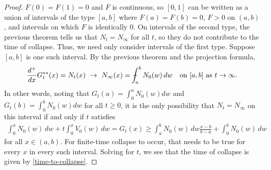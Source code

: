 \documentclass[11pt]{article}
\numberwithin{equation}{section}
\def\Xint#1{\mathchoice
{\XXint\displaystyle\textstyle{#1}}%
{\XXint\textstyle\scriptstyle{#1}}%
{\XXint\scriptstyle\scriptscriptstyle{#1}}%
{\XXint\scriptscriptstyle\scriptscriptstyle{#1}}%
   \!\int}
\def\XXint#1#2#3{{\setbox0=\hbox{$#1{#2#3}{\int}$}
\vcenter{\hbox{$#2#3$}}\kern-.5\wd0}}
\def\dashint{\Xint-}
\begin{document}
\begin{proof}
    $F(0)=F(1)=0$ and $F$ is continuous, so $[0,1]$ can be written as a union of intervals of the type $[a,b]$ where $F(a)=F(b)=0$, $F>0$ on $(a,b)$, and intervals on which $F$ is identically $0$. On intervals of the second type, the previous theorem tells us that $N_t=N_\infty$ for all $t$, so they do not contribute to the time of collapse. Thus, we need only consider intervals of the first type. Suppose $[a,b]$ is one such interval. By the previous theorem and the projection formula,  
    \begin{align*}
        \frac{d^+}{dx}G_t^{**}(x)=N_t(x) \ \to \ N_\infty(x)=\dashint_a^b N_0(w) \, dw \quad \text{on }[a,b]\text{ as }t\to\infty. 
    \end{align*}
    In other words, noting that $G_t(a)=\int_0^a N_0(w)dw$ and $G_t(b)=\int_0^b N_0(w)dw$ for all $t\geq0$, it is the only possibility that $N_t=N_\infty$ on this interval if and only if $t$ satisfies
    \begin{align*}
        \int_0^x N_0(w) \, dw+t\int_0^x V_0(w) \, dw=G_t(x)\geq\int_a^b N_0(w) \, dw\frac{x-b}{b-a}+\int_0^b N_0(w) \, dw 
    \end{align*}
    for all $x\in(a,b)$. For finite-time collapse to occur, that needs to be true for every $x$ in every such interval. Solving for $t$, we see that the time of collapse is given by \eqref{time-to-collapse}. \qedhere 
    



\end{proof}
\end{document}
